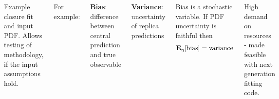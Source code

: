 \begin{frame}
\begin{columns}[t]
    Example closure fit and input PDF.
    \reqnomode
    Allows testing of methodology, if the input assumptions hold.

    \vspace{8pt}
    For example:
    \vspace{8pt}
    
    \textbf{Bias}: difference between central prediction and true observable

    \vspace{8pt}
    \textbf{Variance}: uncertainty of replica predictions

    \vspace{8pt}
    
    Bias is a stochastic variable. If PDF uncertainty is faithful then
    \begin{equation}
        \mathbf{E}_{\eta}[{\rm bias}] = {\rm variance}
    \end{equation}

    \vspace{8pt}
    
    High demand on resources - made feasible with next generation fitting code.
    \end{columns}
\end{frame}
%
